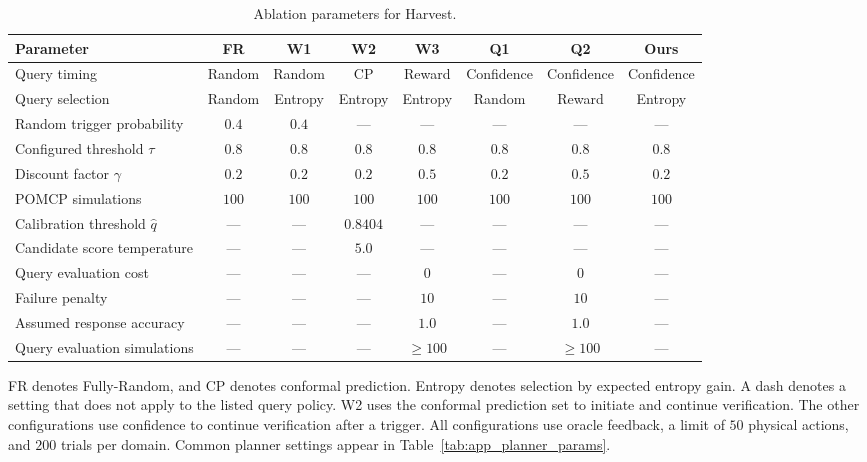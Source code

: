 \begin{table}[!htbp]
\centering
\caption{Ablation parameters for Harvest.}
\label{tab:app_ablation_params_tomato}
\small
\setlength{\tabcolsep}{4pt}
\renewcommand{\arraystretch}{1.12}
\begin{tabular*}{\textwidth}{@{\extracolsep{\fill}}lccccccc@{}}
\toprule
Parameter & FR & W1 & W2 & W3 & Q1 & Q2 & \textbf{Ours} \\
\midrule
Query timing & Random & Random & CP & Reward & Confidence & Confidence & Confidence \\
Query selection & Random & Entropy & Entropy & Entropy & Random & Reward & Entropy \\
Random trigger probability & $0.4$ & $0.4$ & --- & --- & --- & --- & --- \\
Configured threshold $\tau$ & $0.8$ & $0.8$ & $0.8$ & $0.8$ & $0.8$ & $0.8$ & $0.8$ \\
Discount factor $\gamma$ & $0.2$ & $0.2$ & $0.2$ & $0.5$ & $0.2$ & $0.5$ & $0.2$ \\
POMCP simulations & $100$ & $100$ & $100$ & $100$ & $100$ & $100$ & $100$ \\
Calibration threshold $\hat{q}$ & --- & --- & $0.8404$ & --- & --- & --- & --- \\
Candidate score temperature & --- & --- & $5.0$ & --- & --- & --- & --- \\
Query evaluation cost & --- & --- & --- & $0$ & --- & $0$ & --- \\
Failure penalty & --- & --- & --- & $10$ & --- & $10$ & --- \\
Assumed response accuracy & --- & --- & --- & $1.0$ & --- & $1.0$ & --- \\
Query evaluation simulations & --- & --- & --- & $\geq 100$ & --- & $\geq 100$ & --- \\
\bottomrule
\end{tabular*}
\par\smallskip
\begin{minipage}{\textwidth}
\footnotesize FR denotes Fully-Random, and CP denotes conformal prediction. Entropy denotes selection by expected entropy gain. A dash denotes a setting that does not apply to the listed query policy. W2 uses the conformal prediction set to initiate and continue verification. The other configurations use confidence to continue verification after a trigger. All configurations use oracle feedback, a limit of $50$ physical actions, and $200$ trials per domain. Common planner settings appear in Table~\ref{tab:app_planner_params}.
\end{minipage}
\end{table}

